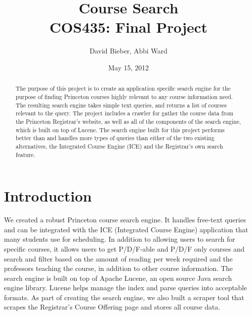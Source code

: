 \documentclass[12pt,letterpaper]{article}
\begin{document}
\title{Course Search \\ \large{COS435: Final Project}}
\author{David Bieber, Abbi Ward}
\date{May 15, 2012}

\maketitle

\pagebreak

\begin{abstract}
The purpose of this project is to create an application specific search engine for the purpose of finding Princeton courses highly relevant to any course information need. The resulting search engine takes simple text queries, and returns a list of courses relevant to the query. The project includes a crawler for gather the course data from the Princeton Registrar's website, as well as all of the components of the search engine, which is built on top of Lucene. The search engine built for this project performs better than and handles more types of queries than either of the two existing alternatives, the Integrated Course Engine (ICE) and the Registrar's own search feature.
\end{abstract}

\section{Introduction}
We created a robust Princeton course search engine. It handles free-text queries and can be integrated with the ICE (Integrated Course Engine) application that many students use for scheduling. In addition to allowing users to search for specific courses, it allows users to get P/D/F-able and P/D/F only courses and search and filter based on the amount of reading per week required and the professors teaching the course, in addition to other course information. The search engine is built on top of Apache Lucene, an open source Java search engine library. Lucene helps manage the index and parse queries into acceptable formats. As part of creating the search engine, we also built a scraper tool that scrapes the Registrar's Course Offering page and stores all course data. 
\end{document}

